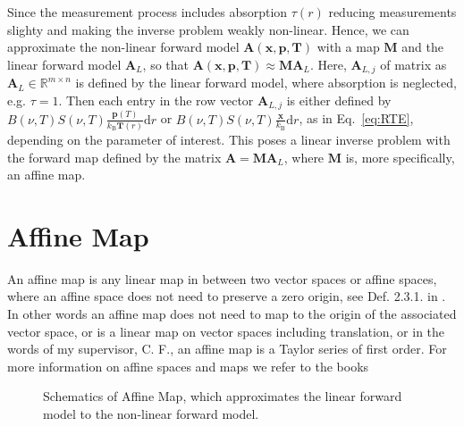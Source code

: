Since the measurement process includes absorption $\tau(r)$ reducing measurements slighty and making the inverse problem weakly non-linear. 
Hence, we can approximate the non-linear forward model $\bm{A}(\bm{x},  \bm{p},\bm{T})$ with a map $\bm{M}$ and the linear forward model $\bm{A}_L$, so that $\bm{A}(\bm{x},  \bm{p},\bm{T}) \approx \bm{M} \bm{A}_L $.
Here, $\bm{A}_{L,j} $ of matrix as $\bm{A}_L \in \mathbb{R}^{m \times n}$ is defined by the linear forward model, where absorption is neglected, e.g. $\tau = 1$. 
Then each entry in the row vector $\bm{A}_{L,j} $ is either defined by $ B(\nu,T) S(\nu, T)   \frac{\bm{p}(T)}{k_{\text{B}} \bm{T}(r)}  \text{d}r$ or $B(\nu,T) S(\nu, T)   \frac{\bm{x}}{k_{\text{B}}}  \text{d}r$, as in Eq.~\eqref{eq:RTE}, depending on the parameter of interest.
This poses a linear inverse problem with the forward map defined by the matrix $\bm{A} = \bm{M} \bm{A}_L$, where $\bm{M}$ is, more specifically, an affine map.


\section{Affine Map}
\label{sec:affine}
An affine map is any linear map in between two vector spaces or affine spaces, where an affine space does not need to preserve a zero origin, see Def. 2.3.1. in \cite{berger2009geometry}.
In other words an affine map does not need to map to the origin of the associated vector space, or is a linear map on vector spaces including translation, or in the words of my supervisor, C. F., an affine map is a Taylor series of first order.
For more information on affine spaces and maps we refer to the books \cite{berger2009geometry, katsumi1994affine}
\begin{figure}[ht!]
	\centering
	\caption[Schematics of Affine Map]{Schematics of Affine Map, which approximates the linear forward model to the non-linear forward model.}
\end{figure}

